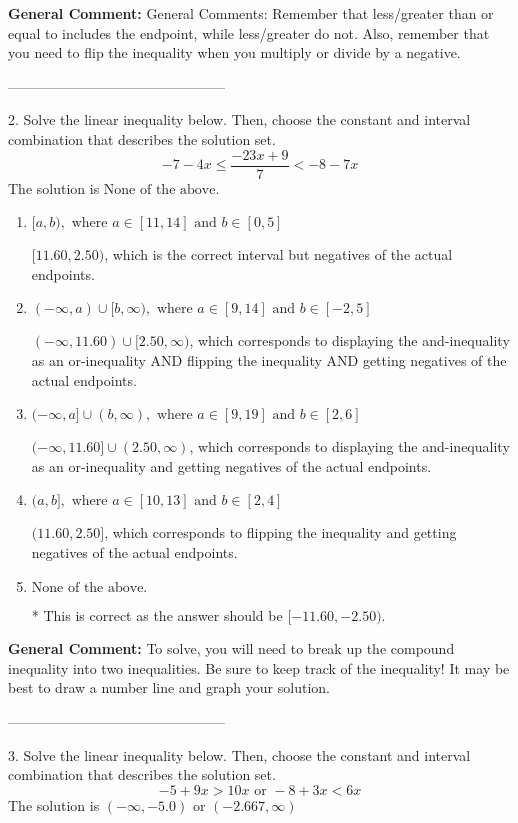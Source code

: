 \documentclass{extbook}[14pt]
\begin{document}
\textbf{General Comment:} General Comments: Remember that less/greater than or equal to includes the endpoint, while less/greater do not. Also, remember that you need to flip the inequality when you multiply or divide by a negative. 

-----------------------------------------------

2. Solve the linear inequality below. Then, choose the constant and interval combination that describes the solution set.
\[ -7 - 4 x \leq \frac{-23 x + 9}{7} < -8 - 7 x \] 
The solution is $ \text{None of the above.} $ 

\begin{enumerate}[label=\Alph*.] 
\item $ [a, b), \text{ where } a \in [11, 14] \text{ and } b \in [0, 5] $ 

 $[11.60, 2.50)$, which is the correct interval but negatives of the actual endpoints. 
\item $ (-\infty, a) \cup [b, \infty), \text{ where } a \in [9, 14] \text{ and } b \in [-2, 5] $ 

 $(-\infty, 11.60) \cup [2.50, \infty)$, which corresponds to displaying the and-inequality as an or-inequality AND flipping the inequality AND getting negatives of the actual endpoints. 
\item $ (-\infty, a] \cup (b, \infty), \text{ where } a \in [9, 19] \text{ and } b \in [2, 6] $ 

 $(-\infty, 11.60] \cup (2.50, \infty)$, which corresponds to displaying the and-inequality as an or-inequality and getting negatives of the actual endpoints. 
\item $ (a, b], \text{ where } a \in [10, 13] \text{ and } b \in [2, 4] $ 

 $(11.60, 2.50]$, which corresponds to flipping the inequality and getting negatives of the actual endpoints. 
\item $ \text{None of the above.} $ 

 * This is correct as the answer should be $[-11.60, -2.50)$. 
\end{enumerate} 
 
\textbf{General Comment:} To solve, you will need to break up the compound inequality into two inequalities. Be sure to keep track of the inequality! It may be best to draw a number line and graph your solution. 

-----------------------------------------------

3. Solve the linear inequality below. Then, choose the constant and interval combination that describes the solution set.
\[ -5 + 9 x > 10 x \text{ or } -8 + 3 x < 6 x \] 
The solution is $ (-\infty, -5.0) \text{ or } (-2.667, \infty) $ 
\end{document}
